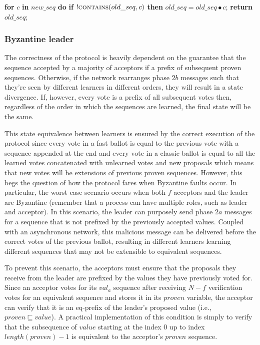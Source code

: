 \begin{algorithm}
\begin{algorithmic}[1]
		\State		
		\State \textbf{for} $c$ \textbf{in} $new\_seq$ \textbf{do} 
		\State \hspace{\algorithmicindent} \textbf{if} $!\Call{contains}{old\_seq,c}$ \textbf{then}
		\State \hspace{\algorithmicindent}\hspace{\algorithmicindent}\hspace{\algorithmicindent} $old\_seq =  old\_seq \bullet c$;
		\State \textbf{return} $old\_seq$;
		\EndFunction
	\end{algorithmic}
\end{algorithm}

\subsubsection{Byzantine leader}
The correctness of the protocol is heavily dependent on the guarantee that the sequence accepted by a majority of acceptors if a prefix of subsequent proven sequences. Otherwise, if the network rearranges phase $2b$ messages such that they're seen by different learners in different orders, they will result in a state divergence. If, however, every vote is a prefix of all subsequent votes then, regardless of the order in which the sequences are learned, the final state will be the same. \par 
This state equivalence between learners is ensured by the correct execution of the protocol since every vote in a fast ballot is equal to the previous vote with a sequence appended at the end and every vote in a classic ballot is equal to all the learned votes concatenated with unlearned votes and new proposals which means that new votes will be extensions of previous proven sequences. However, this begs the question of how the protocol fares when Byzantine faults occur. In particular, the worst case scenario occurs when both $f$ acceptors and the leader are Byzantine (remember that a process can have multiple roles, such as leader and acceptor). In this scenario, the leader can purposely send phase $2a$ messages for a sequence that is not prefixed by the previously accepted values. Coupled with an asynchronous network, this malicious message can be delivered before the correct votes of the previous ballot, resulting in different learners learning different sequences that may not be extensible to equivalent sequences. \par
To prevent this scenario, the acceptors must ensure that the proposals they receive from the leader are prefixed by the values they have previously voted for. Since an acceptor votes for its $val_a$ sequence after receiving $N-f$ verification votes for an equivalent sequence and stores it in its $proven$ variable, the acceptor can verify that it is an eq-prefix of the leader's proposed value (i.e., $proven \sqsubseteq value$). A practical implementation of this condition is simply to verify that the  subsequence of $value$ starting at the index $0$ up to index $length(proven)-1$ is equivalent to the acceptor's $proven$ sequence. 

